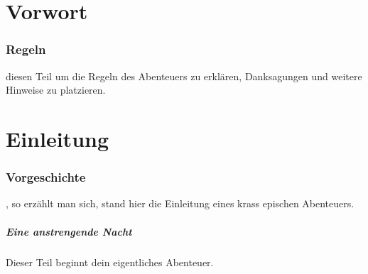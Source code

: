
\chapter*{Vorwort}

\subsection{Regeln}

 diesen Teil um die Regeln des Abenteuers zu erklären, Danksagungen und weitere Hinweise zu platzieren.
\chapter*{Einleitung}

\subsection{Vorgeschichte}

, so erzählt man sich, stand hier die Einleitung eines krass epischen Abenteuers.

\paragraph{Eine anstrengende Nacht}

Dieser Teil beginnt dein eigentliches Abenteuer.

